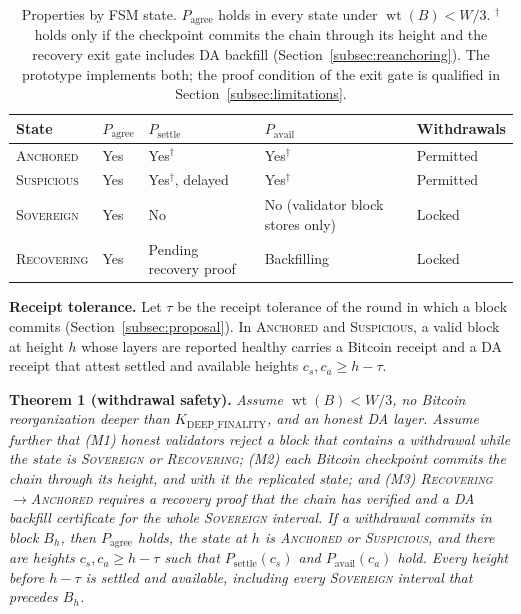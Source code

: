 \begin{table}[h]
\caption{Properties by FSM state. $P_{\text{agree}}$ holds in every state
under $\operatorname{wt}(B) < W/3$. $^\dagger$ holds only if the checkpoint
commits the chain through its height and the recovery exit gate includes DA
backfill (Section~\ref{subsec:reanchoring}). The prototype implements both;
the proof condition of the exit gate is qualified in
Section~\ref{subsec:limitations}.}
\label{tab:mode-security}
\centering
\footnotesize
\begin{tabular}{@{}lllll@{}}
\toprule
\textbf{State} & $P_{\text{agree}}$ & $P_{\text{settle}}$ &
$P_{\text{avail}}$ & \textbf{Withdrawals} \\
\midrule
\textsc{Anchored} & Yes & Yes$^\dagger$ & Yes$^\dagger$ & Permitted \\
\textsc{Suspicious} & Yes & Yes$^\dagger$, delayed & Yes$^\dagger$ & Permitted \\
\textsc{Sovereign} & Yes & No & No (validator block stores only) & Locked \\
\textsc{Recovering} & Yes & Pending recovery proof & Backfilling & Locked \\
\bottomrule
\end{tabular}
\end{table}

\textbf{Receipt tolerance.} Let $\tau$ be the receipt tolerance of the round
in which a block commits (Section~\ref{subsec:proposal}). In
\textsc{Anchored} and \textsc{Suspicious}, a valid block at height $h$ whose
layers are reported healthy carries a Bitcoin receipt and a DA receipt that
attest settled and available heights $c_s, c_a \geq h - \tau$.

\textbf{Theorem 1 (withdrawal safety).} \emph{Assume $\operatorname{wt}(B) < W/3$, no Bitcoin
reorganization deeper than $K_{\text{DEEP\_FINALITY}}$, and an honest DA
layer. Assume further that (M1) honest validators reject a block that
contains a withdrawal while the state is \textsc{Sovereign} or
\textsc{Recovering}; (M2) each Bitcoin checkpoint commits the chain through
its height, and with it the replicated state; and (M3)
\textsc{Recovering}$\to$\textsc{Anchored} requires a recovery proof that the
chain has verified and a DA backfill certificate for the whole
\textsc{Sovereign} interval. If a withdrawal commits in block $B_h$, then
$P_{\text{agree}}$ holds, the state at $h$ is \textsc{Anchored} or
\textsc{Suspicious}, and there are heights $c_s, c_a \geq h - \tau$ such
that $P_{\text{settle}}(c_s)$ and $P_{\text{avail}}(c_a)$ hold. Every height
before $h - \tau$ is settled and available, including every
\textsc{Sovereign} interval that precedes $B_h$.}


